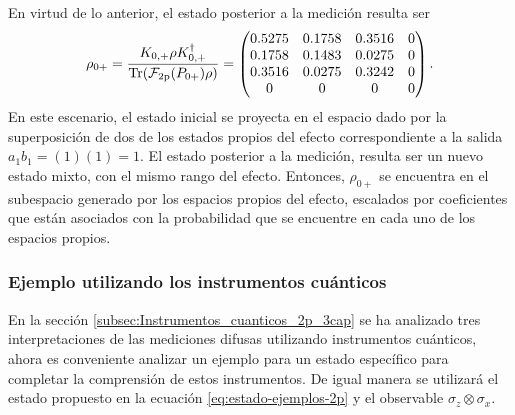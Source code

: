  En virtud de lo anterior, el estado posterior a la medición resulta ser 
\[\rho_{0+}= \dfrac{K_{0 ,+} \rho K^\dagger_{0 ,+}}{{\rm Tr}(\mathcal{F}_{2\text{p}}(P_{0+})\rho)}=\begin{pmatrix}
    0.5275 &  0.1758 &  0.3516 &  0\\
    0.1758 &  0.1483 &  0.0275 &  0\\
    0.3516 &  0.0275 &  0.3242 &  0\\
    0 &  0 &  0&  0
  \end{pmatrix}.\] En este escenario, el estado inicial se proyecta en el espacio dado por la superposición de dos de los estados propios del efecto correspondiente a la salida $a_1 b_1=(1)(1)=1$. El estado posterior a la medición, resulta ser un nuevo estado mixto, con el mismo rango del efecto. Entonces, $\rho_{0+}$ se encuentra en el subespacio generado por los espacios propios del efecto, escalados por coeficientes que están asociados con la probabilidad que se encuentre en cada uno de los espacios propios. 

\subsubsection{Ejemplo utilizando los instrumentos cuánticos} %

En la sección {\ref{subsec:Instrumentos_cuanticos_2p_3cap}} se ha analizado tres interpretaciones de las mediciones difusas utilizando instrumentos cuánticos, ahora es conveniente analizar un ejemplo para un estado específico para completar la comprensión de estos instrumentos. De igual manera se utilizará el estado propuesto en la ecuación {\eqref{eq:estado-ejemplos-2p}} y el observable $\sigma_z\otimes\sigma_x$.


